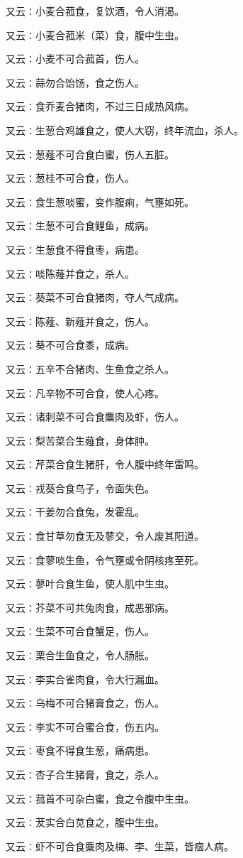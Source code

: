 \documentclass[a4paper,12pt,UTF8,twoside]{ctexbook}
\begin{document}
又云∶小麦合菰食，复饮酒，令人消渴。

又云∶小麦合菰米（菜）食，腹中生虫。

又云∶小麦不可合菰首，伤人。

又云∶蒜勿合饴饧，食之伤人。

又云∶食乔麦合猪肉，不过三日成热风病。

又云∶生葱合鸡雄食之，使人大窃，终年流血，杀人。

又云∶葱薤不可合食白蜜，伤人五脏。

又云∶葱桂不可合食，伤人。

又云∶食生葱啖蜜，变作腹痢，气壅如死。

又云∶生葱不可合食鲤鱼，成病。

又云∶生葱食不得食枣，病患。

又云∶啖陈薤并食之，杀人。

又云∶葵菜不可合食猪肉，夺人气成病。

又云∶陈薤、新薤并食之，伤人。

又云∶葵不可合食黍，成病。

又云∶五辛不合猪肉、生鱼食之杀人。

又云∶凡辛物不可合食，使人心疼。

又云∶诸刺菜不可合食麋肉及虾，伤人。

又云∶梨苦菜合生薤食，身体肿。

又云∶芹菜合食生猪肝，令人腹中终年雷鸣。

又云∶戎葵合食鸟子，令面失色。

又云∶干姜勿合食兔，发霍乱。

又云∶食甘草勿食无及蓼交，令人废其阳道。

又云∶食蓼啖生鱼，令气壅或令阴核疼至死。

又云∶蓼叶合食生鱼，使人肌中生虫。

又云∶芥菜不可共兔肉食，成恶邪病。

又云∶生菜不可合食蟹足，伤人。

又云∶栗合生鱼食之，令人肠胀。

又云∶李实合雀肉食，令大行漏血。

又云∶乌梅不可合猪膏食之，伤人。

又云∶李实不可合蜜合食，伤五内。

又云∶枣食不得食生葱，痛病患。

又云∶杏子合生猪膏，食之，杀人。

又云∶菰首不可杂白蜜，食之令腹中生虫。

又云∶茇实合白苋食之，腹中生虫。

又云∶虾不可合食麋肉及梅、李、生菜，皆痼人病。
\end{document}
